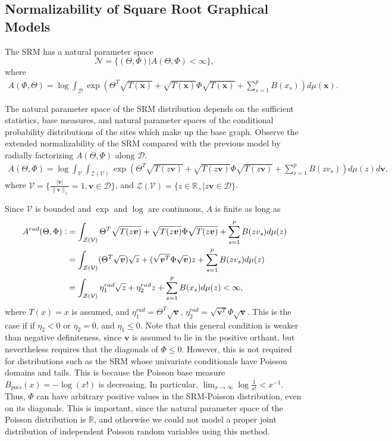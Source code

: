 \documentclass{samkoelleprelimworking}
\begin{document}
\subsection{Normalizability of Square Root Graphical Models}

The SRM has a natural parameter space
\[\mathcal{N} = \{ ( \Theta, \Phi)  \vert A(\Theta, \Phi) < \infty \} , \]
where
\begin{align}
A(\Phi, \Theta) = \log \int_\mathcal{D} \exp{(\Theta^T \sqrt{T(\bm{x})} +  \sqrt{T(\bm{x})} \Phi \sqrt{T(\bm{x})} + \sum_{s=1}^p B(x_s))}d\mu (\bm{x}).
\end{align}

The natural parameter space of the SRM distribution depends on the sufficient statistics, base measures, and natural parameter spaces of the conditional probability distributions of the sites which make up the base graph.  Observe the extended normalizability of the SRM compared with the previous model by radially factorizing $A(\Theta, \Phi ) $ along $\mathcal{D}$.
\begin{align}
A(\Theta , \Phi) = \log \int_\mathcal{V} \int_{\mathcal{Z}(\mathcal{V})} \exp{(\Theta^T \sqrt{T(z \bm{v})} +  \sqrt{T(z \bm{v})} \Phi \sqrt{T(z \bm{v})} + \sum_{s=1}^p B(zv_s))} d\mu(z)d\bm{v},
\end{align}
where $\mathcal{V} =\{\frac{\vert \bm{v} \vert}{  \|\bm{v}\|_1} = 1, \bm{v} \in \mathcal{D} \}$, and $\mathcal{Z}(\mathcal{V}) = \{z \in \mathbb{R}_+ \vert z\bm{v} \in \mathcal{D} \}$.

Since $\mathcal{V}$ is bounded and $\exp$ and $\log$ are continuous, $A$ is finite as long as
 \begin{align*}
 A^{rad}(\Theta, \Phi) \vcentcolon & = \int_{\mathcal{Z}(\mathcal{V})} \Theta^T \sqrt{T(z \bm{v})} +  \sqrt{T(z \bm{v})} \Phi \sqrt{T(z \bm{v})} + \sum_{s=1}^p B(zv_s) d\mu(z)\\
 &= \int_{\mathcal{Z}(\mathcal{V})}  (\Theta^T \sqrt{\bm{v}}) \sqrt{z} +  (\sqrt{\bm{v}^T} \Phi \sqrt{\bm{v}})z  + \sum_{s=1}^p B(zv_s)d\mu(z)\\
&= \int_{\mathcal{Z}(\mathcal{V})} \eta_{1}^{rad} \sqrt{z} + \eta_{2}^{rad} z + \sum_{s=1}^p B(x_s) d\mu(z) < \infty,  \\ 
\end{align*}
where $T(x) = x$ is assumed, and $\eta_{1}^{rad} = \Theta^T \sqrt{\bm{v}}$,  $\eta_{2}^{rad} = \sqrt{\bm{v}^T} \Phi \sqrt{\bm{v}}$.  This is the case if 
 if $\eta_2 < 0$ or $\eta_2 = 0$, and $\eta_1 \leq 0$.  Note that this general condition is weaker than negative definiteness, since $\bm{v}$ is assumed to lie in the positive orthant, but nevertheless requires that the diagonals of $\Phi \leq 0$.  However, this is not required for distributions such as the SRM whose univariate conditionals have Poisson domains and tails.  This is because the Poisson base measure $B_{\textit{pois}}(x) = - \log (x!)$ is decreasing.  In particular, $\lim_{x \to \infty} \log \frac{1}{x!} < x^{-1}.$  Thus, $\Phi$ can have arbitrary positive values in the SRM-Poisson distribution, even on its diagonals.  This is important, since the natural parameter space of the Poisson distribution is $\mathbb{R}$, and otherwise we could not model a proper joint distribution of independent Poisson random variables using this method.
\end{document}
